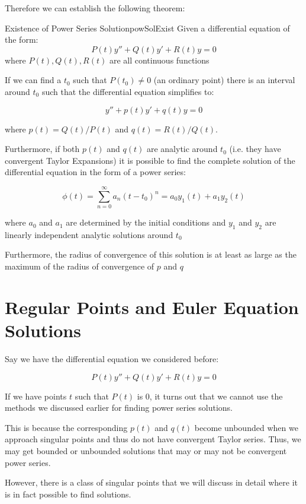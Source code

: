\documentclass{report}
\begin{document}
Therefore we can establish the following theorem:

\begin{mytheo}{Existence of Power Series Solution}{powSolExist}
    Given a differential equation of the form:
    $$P(t)y'' + Q(t)y' + R(t)y = 0$$
    where $P(t), Q(t), R(t)$ are all continuous functions
    
    If we can find a $t_0$ such that $P(t_0) \neq 0$ (an ordinary point) there is an interval around $t_0$ such that the differential equation simplifies to:
    
    $$y'' + p(t)y' + q(t)y = 0$$

    where $p(t) = Q(t)/P(t)$ and $q(t) = R(t)/Q(t)$.
    
    Furthermore, if both $p(t)$ and $q(t)$ are analytic around $t_0$ (i.e. they have convergent Taylor Expansions) it is possible to find the complete solution of the differential equation in the form of a power series:
    
    $$\phi(t) = \sum_{n=0}^{\infty}a_n(t-t_0)^n = a_0y_1(t) + a_1y_2(t)$$
    
    where $a_0$ and $a_1$ are determined by the initial conditions and $y_1$ and $y_2$ are linearly independent analytic solutions around $t_0$
    
    Furthermore, the radius of convergence of this solution is at least as large as the maximum of the radius of convergence of $p$ and $q$
    
\end{mytheo}



\section{Regular Points and Euler Equation Solutions}

Say we have the differential equation we considered before:

$$P(t)y'' + Q(t)y' + R(t)y = 0$$

If we have points $t$ such that $P(t)$ is 0, it turns out that we cannot use the methods we discussed earlier for finding power series solutions.

This is because the corresponding $p(t)$ and $q(t)$ become unbounded when we approach singular points and thus do not have convergent Taylor series. Thus, we may get bounded or unbounded solutions that may or may not be convergent power series.

However, there is a class of singular points that we will discuss in detail where it is in fact possible to find solutions.
\end{document}
